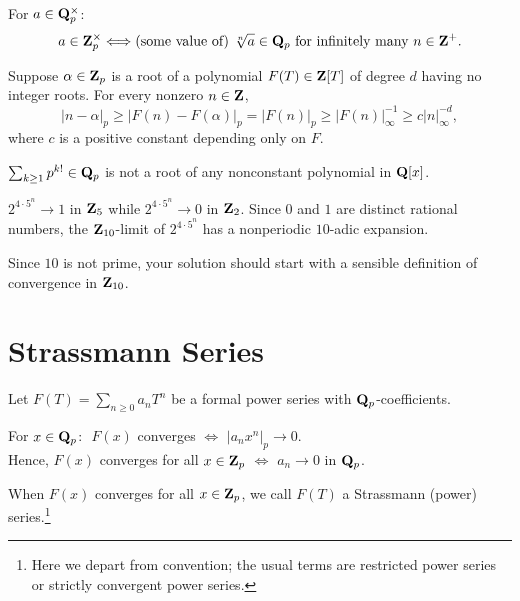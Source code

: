 \begin{prob}\label{prob:103}
For $a \in \mathbf{Q}_p^{\times}$: 
\[ a \in \mathbf{Z}_p^{\times} \Longleftrightarrow \text{(some value of) $\sqrt[n]{a} \in \mathbf{Q}_p$ for infinitely many $n\in \mathbf{Z}^{+}$}. \]
\end{prob}


\begin{prob}\label{prob:104} Suppose $\alpha \in \mathbf{Z}_p$ is a root of a polynomial $F(T) \in \mathbf{Z}[T]$ of degree $d$ having no integer roots. For every nonzero $n \in \mathbf{Z}$,
\[ |n-\alpha|_{p} \ge |F(n)-F(\alpha)|_{p} = |F(n)|_p \ge |F(n)|_{\infty}^{-1} \ge c|n|_{\infty}^{-d}, \]
where $c$ is a positive constant depending only on $F$.
\end{prob}




\begin{prob}\label{prob:105} $\sum_{k\ge 1} p^{k!}\in \mathbf{Q}_p$ is not a root of any nonconstant polynomial in $\mathbf{Q}[x]$.\end{prob}


\begin{prob}\label{prob:106} $2^{4\cdot 5^n}\to 1$ in $\mathbf{Z}_{5}$ while $2^{4\cdot 5^n}\to 0$ in $\mathbf{Z}_{2}$. Since $0$ and $1$ are distinct rational numbers, the $\mathbf{Z}_{10}$-limit of $2^{4\cdot 5^n}$ has a nonperiodic $10$-adic expansion. 

{\scriptsize Since $10$ is not prime, your solution should start with a sensible definition of convergence in $\mathbf{Z}_{10}$.}

\end{prob} 


\section*{Strassmann Series}
Let $F(T) = \sum_{n \ge 0} a_n T^n$ be a formal power series with $\mathbf{Q}_p$-coefficients.

\begin{prob}\label{prob:strass0}\label{prob:107} For $x \in \mathbf{Q}_p$:~\,$F(x)$ converges $\Longleftrightarrow$ $|a_n x^n|_p\to 0$.\\ Hence, $F(x)$ converges for all $x \in \mathbf{Z}_p$ $\Longleftrightarrow$ $a_n\to 0$ in $\mathbf{Q}_p$.
\end{prob}

\vspace{-0.05in}When $F(x)$ converges for all $x \in \mathbf{Z}_p$, we call $F(T)$ a \textsf{Strassmann (power) series}.\footnote{Here we depart from convention; the usual terms are \textsf{restricted power series} or \textsf{strictly convergent power series}.}

